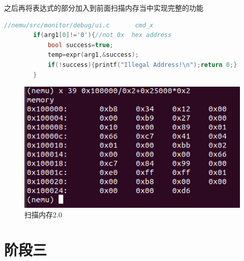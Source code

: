 \documentclass[UTF8,a4paper,10pt]{ctexart}
\begin{document}
{    之后再将表达式的部分加入到前面扫描内存当中实现完整的功能
    \begin{lstlisting}[title=扫描内存2.0,frame=trbl,language={C++}]
        //nemu/src/monitor/debug/ui.c       cmd_x
        if(arg1[0]!='0'){//not 0x  hex address
            bool success=true;
            temp=expr(arg1,&success);
            if(!success){printf("Illegal Address!\n");return 0;}
        }
    \end{lstlisting}
    \begin{figure}[H]
        \centering
        \includegraphics[scale=0.45]{fig/12.png}
        \caption{扫描内存2.0}
    \end{figure}
}
\section{阶段三}
\end{document}
